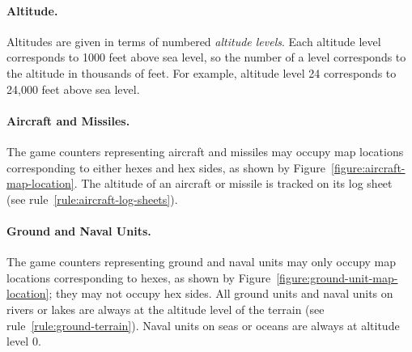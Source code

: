 {\paragraph{Altitude.}\label{rule:altitude}

Altitudes are given in terms of numbered \emph{altitude levels}. Each altitude level corresponds to 1000 feet above sea level, so the number of a level corresponds to the altitude in thousands of feet. For example, altitude level 24 corresponds to 24,000 feet above sea level.

\paragraph{Aircraft and Missiles.} 


The game counters representing aircraft and missiles may occupy map locations corresponding to either hexes and hex sides, as shown by Figure~\ref{figure:aircraft-map-location}. The altitude of an aircraft or missile is tracked on its log sheet (see rule~\ref{rule:aircraft-log-sheets}).

\paragraph{Ground and Naval Units.}

The game counters representing ground and naval units may only occupy map locations corresponding to hexes, as shown by Figure~\ref{figure:ground-unit-map-location}; they may not occupy hex sides. All ground units and naval units on rivers or lakes are always at the altitude level of the terrain (see rule~\ref{rule:ground-terrain}). Naval units on seas or oceans are always at altitude level 0.



}





